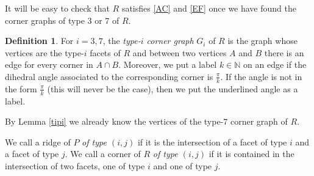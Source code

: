 \documentclass{amsart}
\theoremstyle{definition}
\newtheorem{defn}[lemma]{Definition}
\theoremstyle{remark}
\newcommand{\matN}{\ensuremath {\mathbb{N}}}
\begin{document}
It will be easy to check that $R$ satisfies \ref{AC} and \ref{EF}  once we have found the corner graphs of type $3$ or $7$ of $R$.
\begin{defn}
\label{defcgraph}
    For $i=3,7$, the \emph{type-$i$ corner graph} $G_i$ of $R$ is the graph whose vertices are the type-$i$ facets of $R$ and between two vertices $A$ and $B$ there is an edge for every corner in $A\cap B$. Moreover, we put a label $k\in\matN$ on an edge if the dihedral angle associated to the corresponding corner is $\frac{\pi}{k}$. If the angle is not in the form $\frac{\pi}{k}$ (this will never be the case), then we put the underlined angle as a label. 
\end{defn}

By Lemma \ref{tipi}  we already know the vertices of the type-$7$ corner graph of $R$.

We call a ridge of $P$ \emph{of type $(i,j)$} if it is the intersection of a facet of type $i$ and a facet of type $j$.
We call a corner of $R$ \emph{of type $(i,j)$} if it is contained in the intersection of two facets, one of type $i$ and one of type $j$.
\end{document}
